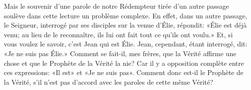 Mais le souvenir d’une parole de notre Rédempteur tirée d’un autre passage
	soulève dans cette lecture un problème complexe.
En effet, dans un autre passage,
	le Seigneur, interrogé par ses disciples sur la venue d’Élie,
	répondit: «Élie est déjà venu;
	au lieu de le reconnaître, ils lui ont fait tout ce qu’ils ont voulu.»
Et, si vous voulez le savoir, c’est Jean qui est Élie.
Jean, cependant, étant interrogé,
	dit: «Je ne suis pas Élie.»
Comment se fait-il, mes frères, que la Vérité affirme une chose
	et que le Prophète de la Vérité la nie?
Car il y a opposition complète entre ces expressions:
	«Il est» et «Je ne suis pas».
Comment donc est-il le Prophète de la Vérité,
	s’il n’est pas d’accord avec les paroles de cette même Vérité?
